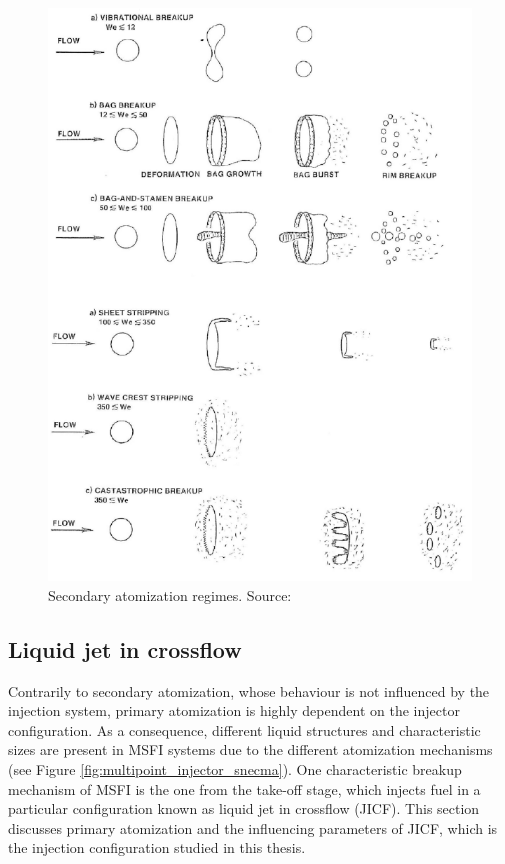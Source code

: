 \begin{itemize}
	\begin{figure}[h!]
		\centering
		\includegraphics[scale=1.0]{./part0_intro/regimes_atomization_secondary}
		\caption[Secondary atomization regimes]{Secondary atomization regimes. Source: }
		\label{fig:regimes_atomization_secondary}
	\end{figure}

\end{itemize}



\subsection*{Liquid jet in crossflow}

Contrarily to secondary atomization, whose behaviour is not influenced by the injection system, primary atomization is highly dependent on the injector configuration. As a consequence, different liquid structures and characteristic sizes are present in MSFI systems due to the different atomization mechanisms (see Figure \ref{fig:multipoint_injector_snecma}). One characteristic breakup mechanism of MSFI is the one from the take-off stage, which injects fuel in a particular configuration known as liquid jet in crossflow (JICF). This section discusses primary atomization and the influencing parameters of JICF, which is the injection configuration studied in this thesis.

